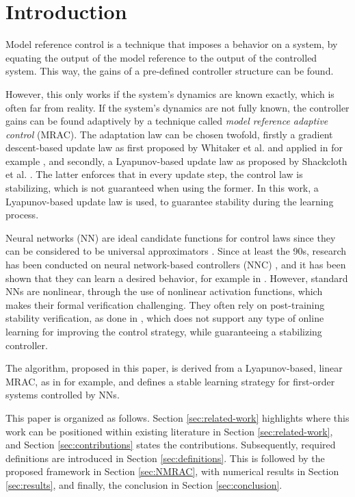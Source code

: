 \section{Introduction}
Model reference control is a technique that imposes a behavior on a system, by equating the output of the model reference to the output of the controlled system. This way, the gains of a pre-defined controller structure can be found. 

However, this only works if the system's dynamics are known exactly, which is often far from reality. If the system's dynamics are not fully known, the controller gains can be found adaptively by a technique called \textit{model reference adaptive control} (MRAC). The adaptation law can be chosen twofold, firstly a gradient descent-based update law as first proposed by Whitaker et al. \cite{whitaker1959adaptive} and applied in for example \cite{wahby_enhanced_2024, bosshartComparisonTwoPID2021}, and secondly, a Lyapunov-based update law as proposed by Shackcloth et al. \cite{shackclothSynthesisModelReference1965}. The latter enforces that in every update step, the control law is stabilizing, which is not guaranteed when using the former. In this work, a Lyapunov-based update law is used, to guarantee stability during the learning process.

Neural networks (NN) are ideal candidate functions for control laws since they can be considered to be universal approximators \cite{hornikUniversalApproximationUnknown1990a}. Since at least the 90s, research has been conducted on neural network-based controllers (NNC) \cite{jiangBriefReviewNeural2017}, and it has been shown that they can learn a desired behavior, for example in \cite{wahby_enhanced_2024, norrisNeuralNetworksControl2021}. However, standard NNs are nonlinear, through the use of nonlinear activation functions, which makes their formal verification challenging. They often rely on post-training stability verification, as done in \cite{kordaStabilityPerformanceVerification2022, revay_convex_2021}, which does not support any type of online learning for improving the control strategy, while guaranteeing a stabilizing controller.

The algorithm, proposed in this paper, is derived from a Lyapunov-based, linear MRAC, as in \cite{lavretskyCombinedCompositeModel2009, slamaModelReferenceAdaptive2018,astromAdaptiveControl2008} for example, and defines a stable learning strategy for first-order systems controlled by NNs.

This paper is organized as follows. Section \ref{sec:related-work} highlights where this work can be positioned within existing literature in Section \ref{sec:related-work}, and Section \ref{sec:contributions} states the contributions. Subsequently, required definitions are introduced in Section \ref{sec:definitions}. This is followed by the proposed framework in Section \ref{sec:NMRAC}, with numerical results in Section \ref{sec:results}, and finally, the conclusion in Section \ref{sec:conclusion}.
